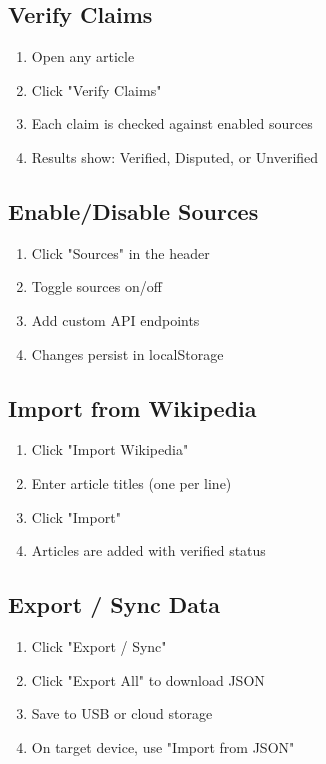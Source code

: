 \documentclass[11pt,a4paper]{article}
\begin{document}
\subsection{Verify Claims}

\begin{enumerate}
    \item Open any article
    \item Click "Verify Claims"
    \item Each claim is checked against enabled sources
    \item Results show: Verified, Disputed, or Unverified
\end{enumerate}

\subsection{Enable/Disable Sources}

\begin{enumerate}
    \item Click "Sources" in the header
    \item Toggle sources on/off
    \item Add custom API endpoints
    \item Changes persist in localStorage
\end{enumerate}

\subsection{Import from Wikipedia}

\begin{enumerate}
    \item Click "Import Wikipedia"
    \item Enter article titles (one per line)
    \item Click "Import"
    \item Articles are added with verified status
\end{enumerate}

\subsection{Export / Sync Data}

\begin{enumerate}
    \item Click "Export / Sync"
    \item Click "Export All" to download JSON
    \item Save to USB or cloud storage
    \item On target device, use "Import from JSON"
\end{enumerate}
\end{document}
